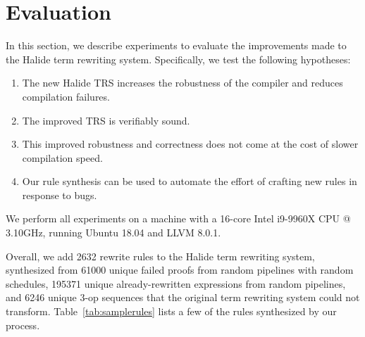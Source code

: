 \documentclass[sigplan,10pt,review,anonymous]{acmart}\settopmatter{printfolios=true,printccs=false,printacmref=false}
\newcommand{\NumRulesSynthesized}{{\color{black} 2632}\xspace}
\newcommand{\NumOpSequences}{{\color{black} 6246}\xspace}
\newcommand{\NumFailureExamples}{{\color{black} 61000}\xspace}
\newcommand{\NumSimplifiedExpressions}{{\color{black} 195371}\xspace}
\begin{document}
\section{Evaluation}
In this section, we describe experiments to evaluate the improvements made to the Halide term rewriting system.  Specifically, we
test the following hypotheses:
\begin{enumerate}
\item The new Halide TRS increases the robustness of the compiler and reduces compilation failures.
\item The improved TRS is verifiably sound.
\item This improved robustness and correctness does not come at the cost of slower compilation speed.
\item Our rule synthesis can be used to automate the effort of crafting new rules in response to bugs.
\end{enumerate}

We perform all experiments on a machine with a 16-core Intel i9-9960X CPU @ 3.10GHz,
running Ubuntu 18.04 and LLVM 8.0.1.



Overall, we add \NumRulesSynthesized rewrite rules to the Halide term rewriting system, synthesized
from \NumFailureExamples unique failed proofs from random pipelines with random schedules, \NumSimplifiedExpressions
unique already-rewritten expressions from random pipelines, and \NumOpSequences unique 3-op sequences
that the original term rewriting system could not transform.  Table~\ref{tab:samplerules} lists a few of the rules synthesized by our process.
\end{document}
